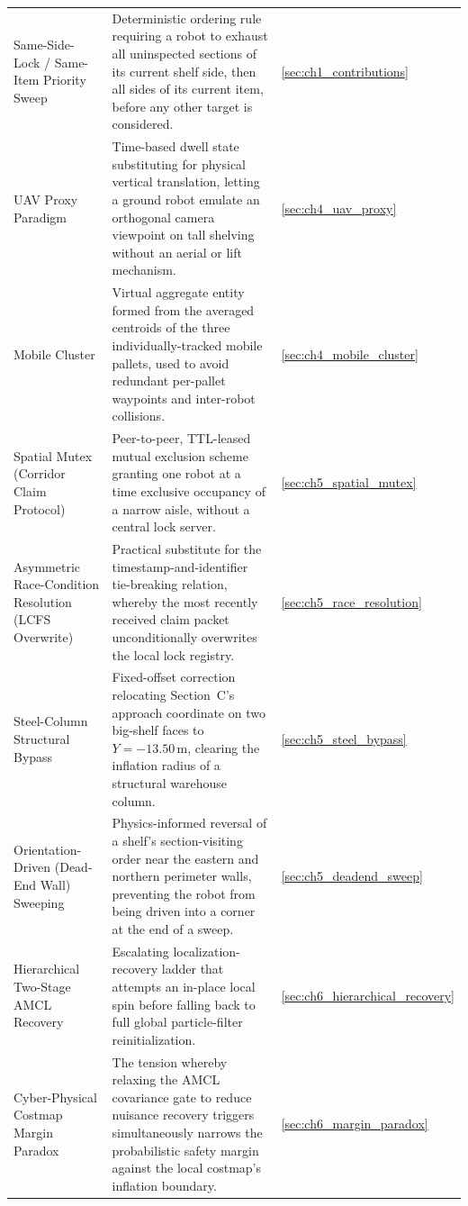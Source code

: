 \begin{longtable}{@{}p{}p{}p{}@{}}
Same-Side-Lock / Same-Item Priority Sweep & Deterministic ordering rule requiring a robot to exhaust all uninspected sections of its current shelf side, then all sides of its current item, before any other target is considered. & \autoref{sec:ch1_contributions} \\
UAV Proxy Paradigm & Time-based dwell state substituting for physical vertical translation, letting a ground robot emulate an orthogonal camera viewpoint on tall shelving without an aerial or lift mechanism. & \autoref{sec:ch4_uav_proxy} \\
Mobile Cluster & Virtual aggregate entity formed from the averaged centroids of the three individually-tracked mobile pallets, used to avoid redundant per-pallet waypoints and inter-robot collisions. & \autoref{sec:ch4_mobile_cluster} \\
Spatial Mutex (Corridor Claim Protocol) & Peer-to-peer, TTL-leased mutual exclusion scheme granting one robot at a time exclusive occupancy of a narrow aisle, without a central lock server. & \autoref{sec:ch5_spatial_mutex} \\
Asymmetric Race-Condition Resolution (LCFS Overwrite) & Practical substitute for the timestamp-and-identifier tie-breaking relation, whereby the most recently received claim packet unconditionally overwrites the local lock registry. & \autoref{sec:ch5_race_resolution} \\
Steel-Column Structural Bypass & Fixed-offset correction relocating Section~C's approach coordinate on two big-shelf faces to $Y = -13.50\,\text{m}$, clearing the inflation radius of a structural warehouse column. & \autoref{sec:ch5_steel_bypass} \\
Orientation-Driven (Dead-End Wall) Sweeping & Physics-informed reversal of a shelf's section-visiting order near the eastern and northern perimeter walls, preventing the robot from being driven into a corner at the end of a sweep. & \autoref{sec:ch5_deadend_sweep} \\
Hierarchical Two-Stage AMCL Recovery & Escalating localization-recovery ladder that attempts an in-place local spin before falling back to full global particle-filter reinitialization. & \autoref{sec:ch6_hierarchical_recovery} \\
Cyber-Physical Costmap Margin Paradox & The tension whereby relaxing the AMCL covariance gate to reduce nuisance recovery triggers simultaneously narrows the probabilistic safety margin against the local costmap's inflation boundary. & \autoref{sec:ch6_margin_paradox} \\

\end{longtable}
